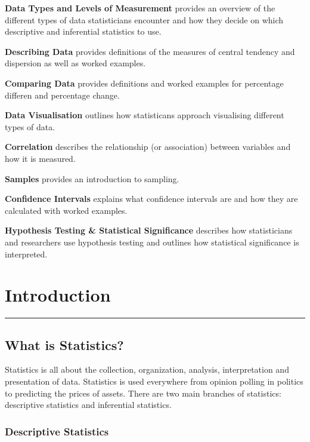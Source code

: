 \documentclass[
]{book}
\begin{document}
\textbf{Data Types and Levels of Measurement} provides an overview of the different types of data statisticians encounter and how they decide on which descriptive and inferential statistics to use.

\textbf{Describing Data} provides definitions of the measures of central tendency and dispersion as well as worked examples.

\textbf{Comparing Data} provides definitions and worked examples for percentage differen and percentage change.

\textbf{Data Visualisation} outlines how statisticans approach visualising different types of data.

\textbf{Correlation} describes the relationship (or association) between variables and how it is measured.

\textbf{Samples} provides an introduction to sampling.

\textbf{Confidence Intervals} explains what confidence intervals are and how they are calculated with worked examples.

\textbf{Hypothesis Testing \& Statistical Significance} describes how statisticians and researchers use hypothesis testing and outlines how statistical significance is interpreted.

\hypertarget{intro}{%
\chapter{Introduction}\label{intro}}

\begin{center}\rule{0.5\linewidth}{0.5pt}\end{center}

\hypertarget{what-is-statistics}{%
\section{What is Statistics?}\label{what-is-statistics}}

Statistics is all about the collection, organization, analysis, interpretation and presentation of data. Statistics is used everywhere from opinion polling in politics to predicting the prices of assets. There are two main branches of statistics: descriptive statistics and inferential statistics.

\hypertarget{descriptive-statistics}{%
\subsection{Descriptive Statistics}\label{descriptive-statistics}}
\end{document}
